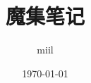 \documentclass[twoside,a4paper,openright,titlepage,draft]{ctexrep}
\begin{document}
\begin{titlepage}

\title{魔集笔记}
\author{miil}
\date{\today}
\maketitle

\end{titlepage}
\end{document}
